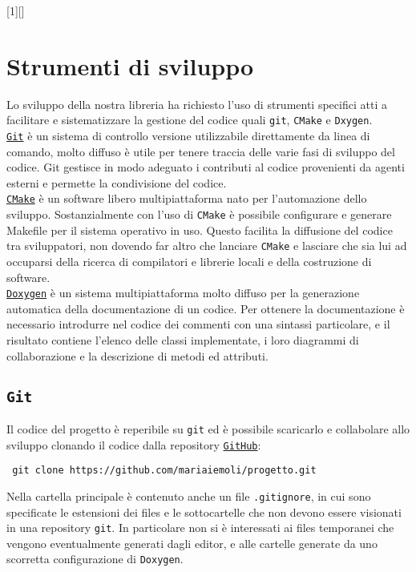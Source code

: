 [1][]{}{}


\chapter{Strumenti di sviluppo}
Lo sviluppo della nostra libreria ha richiesto l'uso di strumenti specifici atti a facilitare e sistematizzare la gestione del codice quali \texttt{git}, \texttt{CMake} e \texttt{Dxygen}.\\
\href{https://github.com/}{\texttt{Git}} è un sistema di controllo versione utilizzabile direttamente da linea di comando, molto diffuso è utile per tenere traccia delle varie fasi di sviluppo del codice. Git gestisce in modo adeguato i contributi al codice provenienti da agenti esterni e permette la condivisione del codice.\\
\href{http://www.cmake.org/}{\texttt{CMake}} è un software libero multipiattaforma nato per l'automazione dello sviluppo. Sostanzialmente con l'uso di \texttt{CMake} è possibile configurare e generare Makefile per il sistema operativo in uso. Questo facilita la diffusione del codice tra sviluppatori, non dovendo far altro che lanciare \texttt{CMake} e lasciare che sia lui ad occuparsi della ricerca di compilatori e librerie locali e della costruzione di software.\\
\href{www.doxygen.org/}{\texttt{Doxygen}} è un sistema multipiattaforma molto diffuso per la generazione automatica della documentazione di un codice. Per ottenere la documentazione è necessario introdurre nel codice dei commenti con una sintassi particolare, e il risultato contiene l’elenco delle classi implementate, i loro diagrammi di collaborazione e la descrizione di metodi ed attributi.

\section{\texttt{Git}}
Il codice del progetto è reperibile su \texttt{git} ed è possibile scaricarlo e collabolare allo sviluppo clonando il codice dalla repository  \href{https://github.com/}{\texttt{GitHub}}:\\
\begin{center}
\texttt{ git clone https://github.com/mariaiemoli/progetto.git}
\end{center}
Nella cartella principale è contenuto anche un file \texttt{.gitignore}, in cui sono specificate le estensioni dei files e le sottocartelle che non devono essere visionati in una repository \texttt{git}. In particolare non si è interessati ai files temporanei che vengono eventualmente generati dagli editor, e alle cartelle generate da uno scorretta configurazione di \texttt{Doxygen}.

